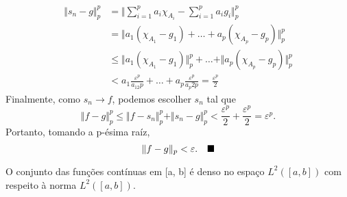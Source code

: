 \documentclass[measure_theory.tex]{subfiles}
\begin{document}
\begin{proof*}
\begin{align*}
		\Vert s_{n}-g \Vert_{p}^{p} & = \biggl\Vert \sum\limits_{i=1}^{p}a_{i}\chi_{A_{i}}-\sum\limits_{i=1}^{p}a_{i}g_{i} \biggr\Vert_{p}^{p}     \\
		                            & = \Vert a_1(\chi_{A_1}-g_1) + \dotsc + a_{p}(\chi_{A_p} - g_p) \Vert_{p}^{p}                                 \\
		                            & \leq \Vert a_1(\chi_{A_1}-g_1) \Vert_{p}^{p} + \dotsc + \Vert a_p(\chi_{A_p}-g_p) \Vert_{p}^{p}              \\
		                            & < a_1\frac{\varepsilon ^{p}}{a_12p} + \dotsc + a_p\frac{\varepsilon ^{p}}{a_p2p} = \frac{\varepsilon^{p}}{2}
	\end{align*}
	Finalmente, como \(s_{n}\to f\), podemos escolher \(s_{n}\) tal que
	\[
		\Vert f-g \Vert_{p}^{p}\leq \Vert f-s_{n} \Vert_{p}^{p}+\Vert s_{n}-g \Vert_{p}^{p}<\frac{\varepsilon ^{p}}{2}+\frac{\varepsilon^{p}}{2} = \varepsilon^{p}.
	\]
	Portanto, tomando a p-ésima raíz,
	\[
		\Vert f-g \Vert_{p} < \varepsilon .\quad \text{$\blacksquare$}
	\]

	\begin{crl*}
		O conjunto das funções contínuas em [a, b] é denso no espaço \(L^{2}([a, b])\) com respeito à norma \(L^{2}([a, b])\).
	\end{crl*}

\end{proof*}
\end{document}
